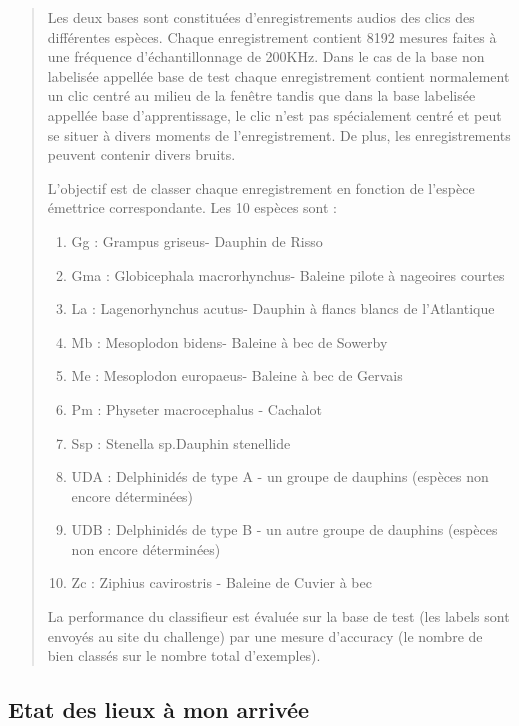 \begin{quotation}
Les deux bases sont constituées d'enregistrements audios des clics des différentes espèces. Chaque enregistrement contient 8192 mesures faites à une fréquence d'échantillonnage de 200KHz. Dans le cas de la base non labelisée appellée base de test chaque enregistrement contient normalement un clic centré au milieu de la fenêtre tandis que dans la base labelisée appellée base d'apprentissage, le clic n'est pas spécialement centré et peut se situer à divers moments de l'enregistrement. De plus, les enregistrements peuvent contenir divers bruits.

\renewcommand{\labelenumi}{\arabic{enumi}}
L'objectif est de classer chaque enregistrement en fonction de l'espèce émettrice correspondante. Les 10 espèces sont :
\begin{enumerate}\addtocounter{enumi}{-1}
\item Gg : Grampus griseus- Dauphin de Risso
\item Gma : Globicephala macrorhynchus- Baleine pilote à nageoires courtes
\item La : Lagenorhynchus acutus- Dauphin à flancs blancs de l'Atlantique
\item Mb : Mesoplodon bidens- Baleine à bec de Sowerby
\item Me : Mesoplodon europaeus- Baleine à bec de Gervais
\item Pm : Physeter macrocephalus - Cachalot
\item Ssp : Stenella sp.Dauphin stenellide
\item UDA : Delphinidés de type A - un groupe de dauphins (espèces non encore déterminées)
\item UDB : Delphinidés de type B - un autre groupe de dauphins (espèces non encore déterminées)
\item Zc : Ziphius cavirostris - Baleine de Cuvier à bec
\end{enumerate}

La performance du classifieur est évaluée sur la base de test (les labels sont envoyés au site du challenge) par une mesure d'accuracy (le nombre de bien classés sur le nombre total d'exemples).
\end{quotation}

\hypertarget{Etat-des-lieux-lors-de-mon-arrivuxe9}{%
\subsection{Etat des lieux à mon arrivée}
\label{Etat-des-lieux-lors-de-mon-arrivuxe9}}

